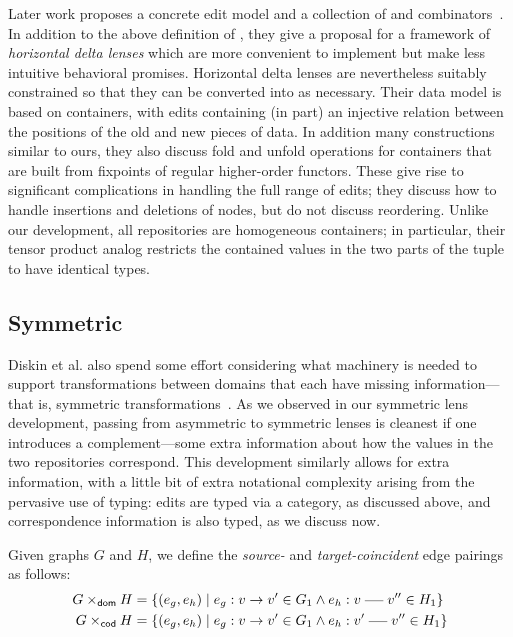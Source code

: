 Later work proposes a concrete edit model and a collection of \WBADLs and
combinators~\cite{Pacheco2012}. In addition to the above definition of
\WBADLs, they give a proposal for a framework of \emph{horizontal delta
lenses} which are more convenient to implement but make less intuitive
behavioral promises. Horizontal delta lenses are nevertheless suitably
constrained so that they can be converted into \WBADLs as necessary. Their
data model is based on containers, with edits containing (in part) an
injective relation between the positions of the old and new pieces of data.
In addition many constructions similar to ours, they also discuss fold and
unfold operations for containers that are built from fixpoints of regular
higher-order functors. These give rise to significant complications in
handling the full range of edits; they discuss how to handle insertions and
deletions of nodes, but do not discuss reordering. Unlike our development,
all repositories are homogeneous containers; in particular, their tensor
product analog restricts the contained values in the two parts of the tuple
to have identical types.

\subsection{Symmetric}
\label{sec:delta:symmetric}
Diskin et al. also spend some effort considering what machinery is needed to
support transformations between domains that each have missing
information---that is, symmetric transformations~\cite{Diskin-Delta11}. As
we observed in our symmetric lens development, passing from asymmetric to
symmetric lenses is cleanest if one introduces a complement---some extra
information about how the values in the two repositories correspond. This
development similarly allows for extra information, with a little bit of
extra notational complexity arising from the pervasive use of typing: edits
are typed via a category, as discussed above, and correspondence information
is also typed, as we discuss now.


\begin{definition}
    Given graphs $G$ and $H$, we define the \emph{source-} and
    \emph{target-coincident} edge pairings as follows:
    \begin{align*}
        G \domco H &= \{(e_g,e_h) \mid e_g : v \dedge v' \in G_1 \land e_h :
        v \uedge v'' \in H_1\} \\
        G \codco H &= \{(e_g,e_h) \mid e_g : v \dedge v' \in G_1 \land e_h :
        v' \uedge v'' \in H_1\}
    \end{align*}
\end{definition}

